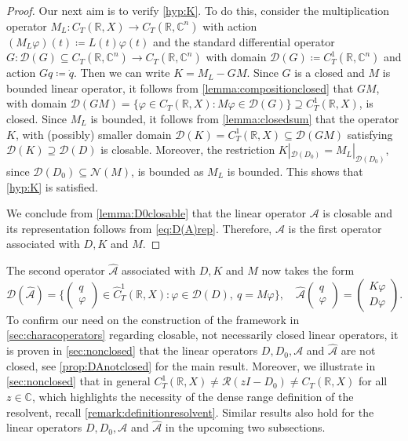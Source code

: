 \documentclass[english]{myarticle}
\begin{document}
\begin{sloppypar}
\begin{proof}
Our next aim is to verify \ref{hyp:K}. To do this, consider the multiplication operator $M_L : C_T(\mathbb{R},X) \to C_T(\mathbb{R},\mathbb{C}^n)$ with action $(M_L \varphi)(t) \coloneqq L(t) \varphi(t)$ and the standard differential operator $G : \mathcal{D}(G) \subseteq C_T(\mathbb{R},\mathbb{C}^n) \to C_T(\mathbb{R},\mathbb{C}^n)$ with domain $\mathcal{D}(G) \coloneqq C_T^1(\mathbb{R},\mathbb{C}^n)$ and action $Gq \coloneqq \dot{q}$. Then we can write $K = M_L - GM$. Since $G$ is a closed and $M$ is bounded linear operator, it follows from \cref{lemma:compositionclosed} that $GM$, with domain $\mathcal{D}(GM) = \{ \varphi \in C_T(\mathbb{R},X) : M\varphi \in \mathcal{D}(G) \} \supseteq C_T^1(\mathbb{R},X)$, is closed. Since $M_L$ is bounded, it follows from \cref{lemma:closedsum} that the operator $K$, with (possibly) smaller domain $\mathcal{D}(K) = C_T^1(\mathbb{R},X) \subseteq \mathcal{D}(GM)$ satisfying $\mathcal{D}(K) \supseteq \mathcal{D}(D)$ is closable. Moreover, the restriction $K|_{\mathcal{D}(D_0)} = M_L |_{\mathcal{D}(D_0)}$, since $\mathcal{D}(D_0) \subseteq \mathcal{N}(M)$, is bounded as $M_L$ is bounded. This shows that \ref{hyp:K} is satisfied.

We conclude from \cref{lemma:D0closable} that the linear operator $\mathcal{A}$ is closable and its representation follows from \eqref{eq:D(A)rep}. Therefore, $\mathcal{A}$ is the first operator associated with $D,K$ and $M$.
\end{proof}
The second operator $\hat{\mathcal{A}}$ associated with $D, K$ and $M$ now takes the form 
\begin{equation*}
    \mathcal{D}(\hat{\mathcal{A}}) = \bigg \{ \begin{pmatrix}
    q\\
    \varphi
    \end{pmatrix}
    \in \hat{C}_T^1(\mathbb{R},X) : \varphi \in \mathcal{D}(D), \ q = M\varphi \bigg \}, \quad 
    \hat{\mathcal{A}}
    \begin{pmatrix}
    q\\
    \varphi
    \end{pmatrix}
    =
    \begin{pmatrix}
    K\varphi \\
    D\varphi
    \end{pmatrix}.
\end{equation*}
To confirm our need on the construction of the framework in \cref{sec:characoperators} regarding closable, not necessarily closed linear operators, it is proven in \cref{sec:nonclosed} that the linear operators $D, D_0, \mathcal{A}$ and $\hat{\mathcal{A}}$ are not closed, see \cref{prop:DAnotclosed} for the main result. Moreover, we illustrate in \cref{sec:nonclosed} that in general $C_T^1(\mathbb{R},X) \neq \mathcal{R}(zI-D_0) \neq C_T(\mathbb{R},X)$ for all $z \in \mathbb{C}$, which highlights the necessity of the dense range definition of the resolvent, recall \cref{remark:definitionresolvent}. Similar results also hold for the linear operators $D, D_0, \mathcal{A}$ and $\hat{\mathcal{A}}$ in the upcoming two subsections.


\end{sloppypar}
\end{document}
